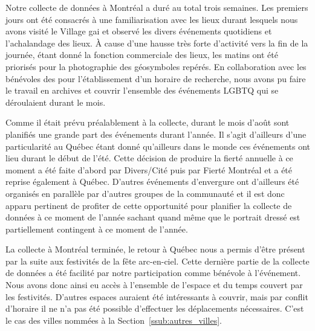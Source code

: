 Notre collecte de données à Montréal a duré au total trois semaines. 
Les premiers jours ont été consacrés à une familiarisation avec les lieux durant lesquels nous avons visité le Village gai et observé les divers événements quotidiens et l'achalandage des lieux. 
À cause d'une hausse très forte d'activité vers la fin de la journée, étant donné la fonction commerciale des lieux, les matins ont été priorisés pour la photographie des géosymboles repérés. 
En collaboration avec les bénévoles des \agq{} pour l'établissement d'un horaire de recherche, nous avons pu faire le travail en archives et couvrir l'ensemble des événements LGBTQ qui se déroulaient durant le mois. 

Comme il était prévu préalablement à la collecte, durant le mois d'août sont planifiés une grande part des événements \lgbt{} durant l'année. 
Il s'agit d'ailleurs d'une particularité au Québec étant donné qu'ailleurs dans le monde ces événements ont lieu durant le début de l'été. 
Cette décision de produire la fierté annuelle à ce moment a été faite d'abord par Divers/Cité puis par Fierté Montréal et a été reprise également à Québec. 
D'autres événements d'envergure ont d'ailleurs été organisés en parallèle par d'autres groupes de la communauté et il est donc apparu pertinent de profiter de cette opportunité pour planifier la collecte de données à ce moment de l'année sachant quand même que le portrait dressé est partiellement contingent à ce moment de l'année. 

La collecte à Montréal terminée, le retour à Québec nous a permis d'être présent par la suite aux festivités de la fête arc-en-ciel. 
Cette dernière partie de la collecte de données a été facilité par notre participation comme bénévole à l'événement. 
Nous avons donc ainsi eu accès à l'ensemble de l'espace et du temps couvert par les festivités. 
D'autres espaces auraient été intéressants à couvrir, mais par conflit d'horaire il ne n'a pas été possible d'effectuer les déplacements nécessaires. 
C'est le cas des villes nommées à la Section~\ref{ssub:autres_villes}.


